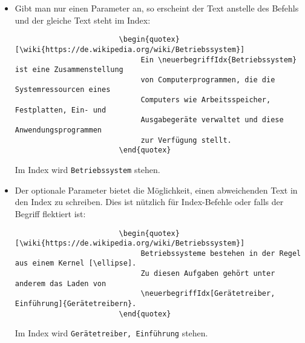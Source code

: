 			\begin{itemize}
				\item 
					Gibt man nur einen Parameter an, so erscheint der Text anstelle des Befehls und der gleiche Text steht im Index: \\
					\begin{verbatim}
						\begin{quotex}[\wiki{https://de.wikipedia.org/wiki/Betriebssystem}]
						     Ein \neuerbegriffIdx{Betriebssystem} ist eine Zusammenstellung 
						     von Computerprogrammen, die die Systemressourcen eines 
						     Computers wie Arbeitsspeicher, Festplatten, Ein- und 
						     Ausgabegeräte verwaltet und diese Anwendungsprogrammen 
						     zur Verfügung stellt. 
						\end{quotex}
					\end{verbatim}
					
					
					Im Index wird \texttt{Betriebssystem} stehen.
				
				\item 
					Der optionale Parameter bietet die Möglichkeit, einen abweichenden Text in den Index zu schreiben. Dies ist nützlich für Index-Befehle oder falls der Begriff flektiert ist:
					\begin{verbatim}
						\begin{quotex}[\wiki{https://de.wikipedia.org/wiki/Betriebssystem}]
						     Betriebssysteme bestehen in der Regel aus einem Kernel [\ellipse]. 
						     Zu diesen Aufgaben gehört unter anderem das Laden von 
						     \neuerbegriffIdx[Gerätetreiber, Einführung]{Gerätetreibern}.
						\end{quotex}
					\end{verbatim}
					
					
					Im Index wird \texttt{Gerätetreiber, Einführung} stehen.
			\end{itemize}


